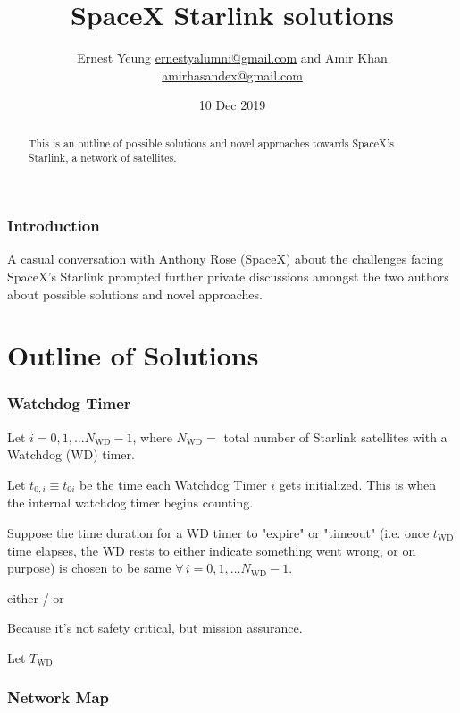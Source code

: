 \documentclass[10pt]{amsart}
\title[SpaceX Starlink solutions]{SpaceX Starlink solutions}
\author{Ernest Yeung \href{mailto:ernestyalumni@gmail.com}{ernestyalumni@gmail.com} and Amir Khan \href{mailto:amirhasandex@gmail.com}{amirhasandex@gmail.com}}
\date{10 Dec 2019}
\begin{document}

\maketitle

\tableofcontents

\begin{abstract}
This is an outline of possible solutions and novel approaches towards SpaceX's Starlink, a network of satellites.
\end{abstract}

\section{Introduction}

A casual conversation with Anthony Rose (SpaceX) about the challenges facing SpaceX's Starlink prompted further private discussions amongst the two authors about possible solutions and novel approaches.

\part{Outline of Solutions}

\section{Watchdog Timer} 

Let $i = 0 , 1, \dots N_{\text{WD}} - 1$, where $N_{\text{WD}} = $ total number of Starlink satellites with a Watchdog (WD) timer.

Let $t_{0,i} \equiv t_{0i}$ be the time each Watchdog Timer $i$ gets initialized. This is when the internal watchdog timer begins counting.

Suppose the time duration for a WD timer to "expire" or "timeout" (i.e. once $t_{\text{WD}}$ time elapses, the WD rests to either indicate something went wrong, or on purpose) is chosen to be same $\forall \, i = 0 ,1, \dots N_{\text{WD}} -1$.

either / or 

Because it's not safety critical, but mission assurance.

Let $T_{\text{WD}}$

\section{Network Map}
\end{document}
